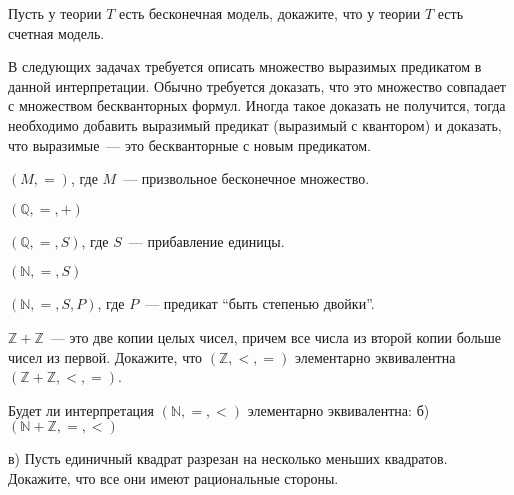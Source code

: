 \setcounter{curtask}{15}


\begin{task}
    Пусть у теории $T$ есть бесконечная модель, докажите, что у теории
    $T$ есть счетная модель.
\end{task}

В следующих задачах требуется описать множество выразимых предикатом в
данной интерпретации. Обычно требуется доказать, что это множество
совпадает с множеством бескванторных формул. Иногда такое доказать не
получится, тогда необходимо добавить выразимый предикат (выразимый с
квантором) и доказать, что выразимые~--- это бескванторные с новым
предикатом.

\begin{task}
    $(M, =)$, где $M$~--- призвольное бесконечное множество.
\end{task}

\begin{task}
    $(\mathbb{Q}, =, +)$
\end{task}

\begin{task}
    $(\mathbb{Q}, =, S)$, где $S$~--- прибавление единицы.
\end{task}

\begin{task}
    $(\mathbb{N}, =, S)$
\end{task}

\begin{task}
    $(\mathbb{N}, =, S, P)$, где $P$~--- предикат ``быть степенью двойки''.
\end{task}

\breakline

\begin{ptask}{12}
	$\mathbb{Z} + \mathbb{Z}$~--- это две копии целых чисел, причем
    все числа из второй копии больше чисел из первой. Докажите, что
    $(\mathbb{Z}, <, =)$ элементарно эквивалентна $(\mathbb{Z} +
    \mathbb{Z}, <, =)$.
\end{ptask}

\begin{ptask}{13}
    Будет ли интерпретация $(\mathbb{N}, =, <)$ элементарно
    эквивалентна:
    б) $(\mathbb{N} + \mathbb{Z}, =, <)$
\end{ptask}

\begin{ptask}{14}
    в) Пусть единичный квадрат разрезан на несколько меньших
    квадратов. Докажите, что все они имеют рациональные стороны.
\end{ptask}